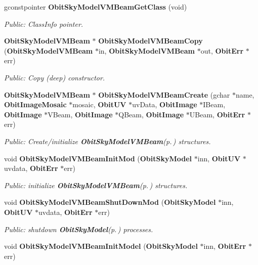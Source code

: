 \begin{CompactItemize}
gconstpointer {\bf Obit\-Sky\-Model\-VMBeam\-Get\-Class} (void)
\begin{CompactList}\small\item\em Public: Class\-Info pointer. \item\end{CompactList}\item 
{\bf Obit\-Sky\-Model\-VMBeam} $\ast$ {\bf Obit\-Sky\-Model\-VMBeam\-Copy} ({\bf Obit\-Sky\-Model\-VMBeam} $\ast$in, {\bf Obit\-Sky\-Model\-VMBeam} $\ast$out, {\bf Obit\-Err} $\ast$err)
\begin{CompactList}\small\item\em Public: Copy (deep) constructor. \item\end{CompactList}\item 
{\bf Obit\-Sky\-Model\-VMBeam} $\ast$ {\bf Obit\-Sky\-Model\-VMBeam\-Create} (gchar $\ast$name, {\bf Obit\-Image\-Mosaic} $\ast$mosaic, {\bf Obit\-UV} $\ast$uv\-Data, {\bf Obit\-Image} $\ast$IBeam, {\bf Obit\-Image} $\ast$VBeam, {\bf Obit\-Image} $\ast$QBeam, {\bf Obit\-Image} $\ast$UBeam, {\bf Obit\-Err} $\ast$err)
\begin{CompactList}\small\item\em Public: Create/initialize {\bf Obit\-Sky\-Model\-VMBeam}{\rm (p.\,\pageref{structObitSkyModelVMBeam})} structures. \item\end{CompactList}\item 
void {\bf Obit\-Sky\-Model\-VMBeam\-Init\-Mod} ({\bf Obit\-Sky\-Model} $\ast$inn, {\bf Obit\-UV} $\ast$uvdata, {\bf Obit\-Err} $\ast$err)
\begin{CompactList}\small\item\em Public: initialize {\bf Obit\-Sky\-Model\-VMBeam}{\rm (p.\,\pageref{structObitSkyModelVMBeam})} structures. \item\end{CompactList}\item 
void {\bf Obit\-Sky\-Model\-VMBeam\-Shut\-Down\-Mod} ({\bf Obit\-Sky\-Model} $\ast$inn, {\bf Obit\-UV} $\ast$uvdata, {\bf Obit\-Err} $\ast$err)
\begin{CompactList}\small\item\em Public: shutdown {\bf Obit\-Sky\-Model}{\rm (p.\,\pageref{structObitSkyModel})} processes. \item\end{CompactList}\item 
void {\bf Obit\-Sky\-Model\-VMBeam\-Init\-Model} ({\bf Obit\-Sky\-Model} $\ast$inn, {\bf Obit\-Err} $\ast$err)

\end{CompactItemize}
